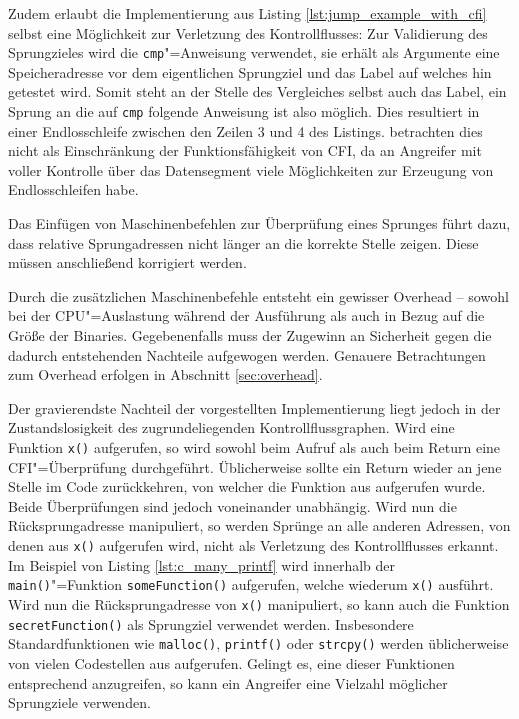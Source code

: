 \documentclass[12pt,%
               oneside,
               a4paper]{uiothesis}
\begin{document}
Zudem erlaubt die Implementierung aus Listing \ref{lst:jump_example_with_cfi} selbst eine Möglichkeit zur Verletzung des Kontrollflusses: Zur Validierung des Sprungzieles wird die \texttt{cmp}"=Anweisung verwendet, sie erhält als Argumente eine Speicheradresse vor dem eigentlichen Sprungziel und das Label auf welches hin getestet wird. Somit steht an der Stelle des Vergleiches selbst auch das Label, ein Sprung an die auf \texttt{cmp} folgende Anweisung ist also möglich. Dies resultiert in einer Endlosschleife zwischen den Zeilen 3 und 4 des Listings. \cite{Abadi.2009} betrachten dies nicht als Einschränkung der Funktionsfähigkeit von CFI, da an Angreifer mit voller Kontrolle über das Datensegment viele Möglichkeiten zur Erzeugung von Endlosschleifen habe.

Das Einfügen von Maschinenbefehlen zur Überprüfung eines Sprunges führt dazu, dass relative Sprungadressen nicht länger an die korrekte Stelle zeigen. Diese müssen anschließend korrigiert werden.

Durch die zusätzlichen Maschinenbefehle entsteht ein gewisser Overhead -- sowohl bei der CPU"=Auslastung während der Ausführung als auch in Bezug auf die Größe der Binaries. Gegebenenfalls muss der Zugewinn an Sicherheit gegen die dadurch entstehenden Nachteile aufgewogen werden. Genauere Betrachtungen zum Overhead erfolgen in Abschnitt \ref{sec:overhead}.

Der gravierendste Nachteil der vorgestellten Implementierung liegt jedoch in der Zustandslosigkeit des zugrundeliegenden Kontrollflussgraphen. Wird eine Funktion \texttt{x()} aufgerufen, so wird sowohl beim Aufruf als auch beim Return eine CFI"=Überprüfung durchgeführt. Üblicherweise sollte ein Return wieder an jene Stelle im Code zurückkehren, von welcher die Funktion aus aufgerufen wurde. Beide Überprüfungen sind jedoch voneinander unabhängig. Wird nun die Rücksprungadresse manipuliert, so werden Sprünge an alle anderen Adressen, von denen aus \texttt{x()} aufgerufen wird, nicht als Verletzung des Kontrollflusses erkannt. Im Beispiel von Listing \ref{lst:c_many_printf} wird innerhalb der \texttt{main()}"=Funktion \texttt{someFunction()} aufgerufen, welche wiederum \texttt{x()} ausführt. Wird nun die Rücksprungadresse von \texttt{x()} manipuliert, so kann auch die Funktion \texttt{secretFunction()} als Sprungziel verwendet werden. Insbesondere Standardfunktionen wie \texttt{malloc()}, \texttt{printf()} oder \texttt{strcpy()} werden üblicherweise von vielen Codestellen aus aufgerufen. Gelingt es, eine dieser Funktionen entsprechend anzugreifen, so kann ein Angreifer eine Vielzahl möglicher Sprungziele verwenden.
\end{document}
